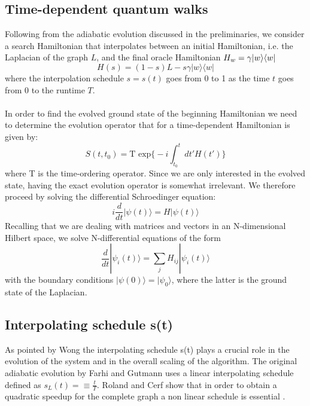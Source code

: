     \subsection{Time-dependent quantum walks}
        Following from the adiabatic evolution discussed in the preliminaries, we consider a search Hamiltonian that interpolates between an initial Hamiltonian, i.e. the Laplacian of the graph $L$, and the final oracle Hamiltonian $H_w=\gamma{|{w}\rangle}{\langle{w}|}$
          \begin{equation}
            H(s) = (1-s)L - s\gamma|w\rangle\langle w|
          \end{equation}
        where the interpolation schedule $s=s(t)$ goes from 0 to 1 as the time $t$ goes from 0 to the runtime $T$. \\ \\In order to find the evolved ground state of the beginning Hamiltonian we need to determine the evolution operator that for a time-dependent Hamiltonian is given by:
        \begin{equation}
          S(t,t_0) = \mbox{T } \mbox{exp}\Big\{ -i\int_{t_0}^{t} dt' H(t')\Big\}
        \end{equation}
        where T is the time-ordering operator. Since we are only interested in the evolved state, having the exact evolution operator is somewhat irrelevant. We therefore proceed by solving the differential Schroedinger equation:
        \begin{equation}
          i\frac{d}{dt}|\psi(t)\rangle = H |\psi(t)\rangle
        \end{equation}
        Recalling that we are dealing with matrices and vectors in an N-dimensional Hilbert space, we solve N-differential equations of the form
        \begin{equation}
        \frac{d}{dt}|\psi_i(t)\rangle = \sum_jH_{ij}|\psi_i(t)\rangle
        \end{equation}
        with the boundary conditions $|\psi(0)\rangle = |\psi_0\rangle$, where the latter is the ground state of the Laplacian.\\

    \clearpage
    \subsection{Interpolating schedule s(t)}\label{subsec:interpolating schedules}
        As pointed by Wong the interpolating schedule s(t) plays a crucial role in the evolution of the system and in the overall scaling of the algorithm.
        The original adiabatic evolution by Farhi and Gutmann \cite{Farhi2000} uses a linear interpolating schedule defined as $s_L(t) =\equiv \frac{t}{T}$. Roland and Cerf show that in order to obtain a quadratic speedup for the complete graph a non linear schedule is essential \cite{Roland2002}\cite{Morley2018}.

